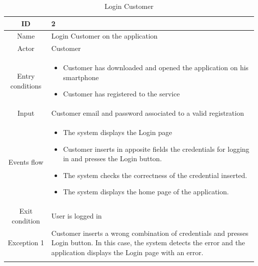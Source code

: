 \begin{longtable}{|c| p{10cm}|}
    \hline ID        & 2 \\
    \hline
    Name             & Login Customer on the application\\
    \hline
    Actor            & Customer \\
    \hline
    Entry conditions & \begin{itemize}[nosep,after=\strut]
        \item Customer has downloaded and opened the application on his smartphone
        \item Customer has registered to the service
    \end{itemize}\\ \hline
    Input            & Customer email and password associated to a valid registration \\
    \hline
    Events flow      & \begin{itemize}[nosep,after=\strut]
        \item The system displays the Login page
        \item Customer inserts in apposite fields the credentials for logging in and presses the Login button.
        \item The system checks the correctness of the credential inserted.
        \item The system displays the home page of the application.
    \end{itemize} \\
    \hline
    Exit condition   & User is logged in \\
    \hline
    \hline
    Exception 1      & Customer inserts a wrong combination of credentials and presses Login button. In this case, the system detects the error and the application displays the Login page with an error. \\
    \hline
    \caption{Login Customer} \\
\end{longtable}
